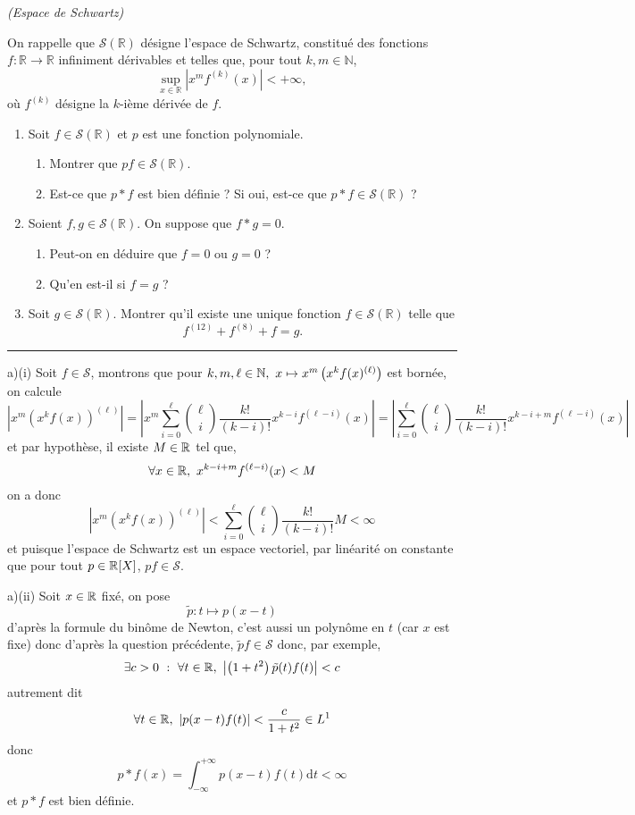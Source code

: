 \documentclass[a4paper,12pt,reqno]{amsart}
\newcommand{\dt}{\mathrm dt}
\newcommand{\inté}{\mathrm{int}\ }
\newcommand{\dstyle}{\displaystyle}
\newcommand{\intr}{\dstyle\int_{-\infty}^{+\infty}}
\newcommand{\Par}[1]{\left(#1\right)}
\renewcommand{\abs}[1]{\left| #1 \right|}
\begin{document}
\begin{exo}\emph{(Espace de Schwartz)}

  On rappelle que $\mathcal{S}(\mathbb{R})$ désigne l'espace de Schwartz, constitué des fonctions $f : \mathbb{R} \to \mathbb{R}$ infiniment dérivables et telles que, pour tout $k, m \in \mathbb{N}$,
  \[
  \sup_{x \in \mathbb{R}} \abs{x^m f^{(k)}(x)} < +\infty,
  \]
  où $f^{(k)}$ désigne la $k$-ième dérivée de $f$.
  \begin{enumerate}
      \item Soit $f \in \mathcal{S}(\mathbb{R})$ et $p$ est une fonction polynomiale.
      \begin{enumerate}
         \item Montrer que $pf \in \mathcal{S}(\mathbb{R})$.
         \item Est-ce que $p\ast f$ est bien définie ? Si oui, est-ce que $p\ast f \in \mathcal{S}(\mathbb{R})$ ?
       \end{enumerate}
      \item Soient $f, g \in \mathcal{S}(\mathbb{R})$. On suppose que $f \ast g = 0$.
      \begin{enumerate}
          \item Peut-on en déduire que $f = 0$ ou $g = 0$ ?
          \item Qu'en est-il si $f = g$ ?
      \end{enumerate}
      \item Soit $g \in \mathcal{S}(\mathbb{R})$. Montrer qu'il existe une unique fonction $f \in \mathcal{S}(\mathbb{R})$ telle que
      \[
        f^{(12)} + f^{(8)} + f = g.
      \]
  \end{enumerate}
\end{exo}

\hrule


a)(i) Soit $f\in \mathcal S$, montrons que pour $k,m,\ell\in\N,\ x\mapsto x^m\Par{x^kf(x)^{(\ell)}}$ est bornée, on calcule 
$$\abs{x^m\Par{x^kf(x)}^{(\ell)}}=\abs{x^m\sum_{i=0}^\ell \binom{\ell}{i}\frac{k!}{\Par{k-i}!}x^{k-i}f^{(\ell-i)}(x)}=\abs{\sum_{i=0}^\ell \binom{\ell}{i}\frac{k!}{\Par{k-i}!}x^{k-i+m}f^{(\ell-i)}(x)}$$
et par hypothèse, il existe $M\in \mathbb{R}$ tel que,
$$\forall x\in\R,\ x^{k-i+m}f^{(\ell-i)}(x)<M$$
on a donc 
$$\abs{x^m\Par{x^kf(x)}^{(\ell)}}<\sum_{i=0}^\ell \binom{\ell}{i}\frac{k!}{\Par{k-i}!}M<\infty$$
et puisque l'espace de Schwartz est un espace vectoriel, par linéarité on constante que pour tout $p\in\mathbb{R}[X]$, $pf\in \mathcal S$.


a)(ii) Soit $x\in\mathbb{R}$ fixé, on pose 
$$\tilde p:t\longmapsto p(x-t)$$
d'après la formule du binôme de Newton, c'est aussi un polynôme en $t$ (car $x$ est fixe) donc d'après la question précédente, $\tilde pf\in \mathcal S$ donc, par exemple, 
$$\exists c>0\ :\ \forall t\in\R,\ \abs{\Par{1+t^2}\tilde p(t)f(t)}<c$$
autrement dit 
$$\forall t\in\R,\ \abs{p(x-t)f(t)}<\frac{c}{1+t^2}\in L^1$$
donc 
$$p*f(x)=\intr p(x-t)f(t)\dt<\infty$$
et $p*f$ est bien définie.
\end{document}
